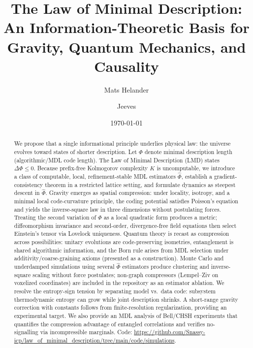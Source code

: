 \documentclass[aps,preprint,onecolumn,longbibliography,nofootinbib]{revtex4-2}
\numberwithin{equation}{section}        %
\begin{document}
\title{The Law of Minimal Description: An Information-Theoretic Basis for Gravity, Quantum Mechanics, and Causality}

\author{Mats Helander}
\author{Jeeves}

\date{\today}

\begin{abstract}
We propose that a single informational principle underlies physical law: the universe evolves toward states of shorter description. Let $\Phi$ denote minimal description length (algorithmic/MDL code length). The Law of Minimal Description (LMD) states $\Delta\Phi\le 0$. Because prefix-free Kolmogorov complexity $K$ is uncomputable, we introduce a class of computable, local, refinement-stable MDL estimators $\widehat\Phi$, establish a gradient-consistency theorem in a restricted lattice setting, and formulate dynamics as steepest descent in $\widehat\Phi$. Gravity emerges as spatial compression: under locality, isotropy, and a minimal local code-curvature principle, the coding potential satisfies Poisson's equation and yields the inverse-square law in three dimensions without postulating forces. Treating the second variation of $\Phi$ as a local quadratic form produces a metric; diffeomorphism invariance and second-order, divergence-free field equations then select Einstein's tensor via Lovelock uniqueness. Quantum theory is recast as compression across possibilities: unitary evolutions are code-preserving isometries, entanglement is shared algorithmic information, and the Born rule arises from MDL selection under additivity/coarse-graining axioms (presented as a construction). Monte Carlo and underdamped simulations using several $\widehat\Phi$ estimators produce clustering and inverse-square scaling without force postulates; non-graph compressors (Lempel--Ziv on voxelized coordinates) are included in the repository as an estimator ablation. We resolve the entropy-sign tension by separating model vs.\ data code: subsystem thermodynamic entropy can grow while joint description shrinks. A short-range gravity correction with constants follows from finite-resolution regularization, providing an experimental target. We also provide an MDL analysis of Bell/CHSH experiments that quantifies the compression advantage of entangled correlations and verifies no-signalling via incompressible marginals. Code: \url{https://github.com/Snassy-icp/law_of_minimal_description/tree/main/code/simulations}.
\end{abstract}
\end{document}

